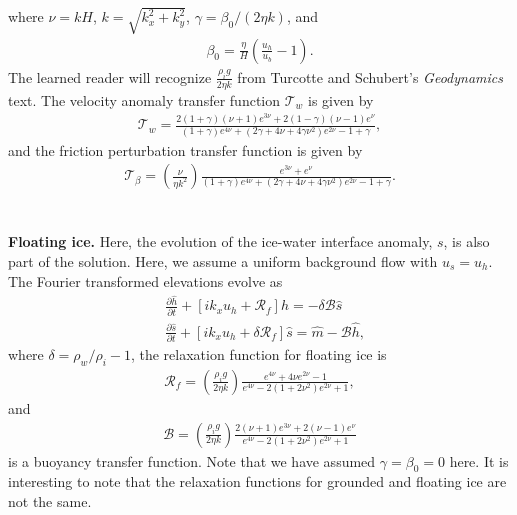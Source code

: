 \documentclass[paper=a4, fontsize=11pt]{article}
\begin{document}
where $\nu = kH$, $k=\sqrt{k_x^2+k_y^2}$, $\gamma = \beta_0/(2\eta k)$, and
\begin{align}
\beta_0  = \frac{\eta}{H}\left(\frac{u_h}{u_b} -1\right).
\end{align}
The learned reader will recognize $\frac{\rho_i g }{2\eta k}$ from Turcotte and Schubert's \emph{Geodynamics} text.
The velocity anomaly transfer function $\mathcal{T}_w$ is given by
\begin{align}
\mathcal{T}_w = \frac{2(1+\gamma)(\nu+1)e^{3\nu}+2(1-\gamma)(\nu-1)e^{\nu}  }{(1+\gamma)e^{4\nu} + (2\gamma+4\nu+4\gamma\nu^2)e^{2\nu} -1 + \gamma },
\end{align}
and the friction perturbation transfer function is given by
\begin{align}
\mathcal{T}_{\beta} =  \left(\frac{\nu}{\eta k^2}\right) \frac{e^{3\nu} + e^{\nu}}{ (1+\gamma)e^{4\nu} + (2\gamma+4\nu+4\gamma\nu^2)e^{2\nu} -1 + \gamma  }.
\end{align}
\\ \\
\textbf{Floating ice.} Here, the evolution of the ice-water interface anomaly, $s$,
is also part of the solution. Here, we assume a uniform background flow with $u_s = u_h$.
The Fourier transformed elevations evolve as
\begin{align}
&\frac{\partial \widehat{h}}{\partial t}+ \left[ik_x u_h  + \mathcal{R}_f\right]\widehat{h} = -\delta\mathcal{B}\widehat{s}\label{hf}\\
&\frac{\partial \widehat{s}}{\partial t}+ [ik_xu_h + \delta\mathcal{R}_f]\widehat{s} = \widehat{m} - \mathcal{B} \widehat{h}, \label{sf}
\end{align}
where $\delta = \rho_w/\rho_i -1$, the relaxation function for floating ice is
\begin{align}
\mathcal{R}_f = \left(\frac{\rho_i g}{2\eta k}\right) \frac{e^{4\nu} +4\nu e^{2\nu} -1 }{e^{4\nu} -2(1+2\nu^2)e^{2\nu} +1}, \label{Rf}
\end{align}
and
\begin{align}
\mathcal{B} = \left(\frac{\rho_i g}{2\eta k}\right) \frac{ 2(\nu+1)e^{3\nu}+2(\nu-1)e^{\nu} }{e^{4\nu} -2(1+2\nu^2)e^{2\nu} +1} \label{B}
\end{align}
is a buoyancy transfer function. Note that we have assumed $\gamma=\beta_0=0$ here.
It is interesting to note that the relaxation functions for grounded and floating
ice are not the same.
\end{document}
